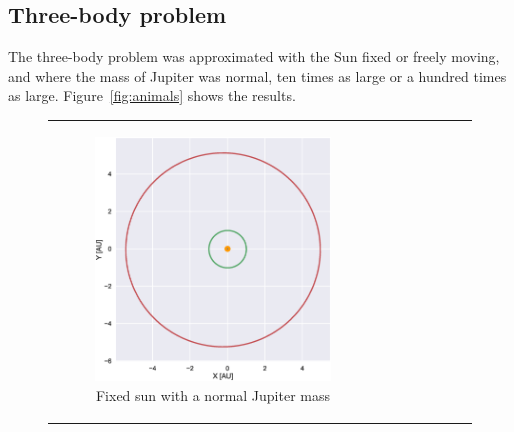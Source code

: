 \documentclass[aps,reprint]{revtex4-1}
\begin{document}
\subsection{Three-body problem}

The three-body problem was approximated with the Sun fixed or freely moving, and
where the mass of Jupiter was normal, ten times as large or a hundred times as
large. Figure~\ref{fig:animals} shows the results.
\begin{figure}
  \begin{tabular}{cc}
    \centering
    \begin{subfigure}[b]{0.5\columnwidth}
        \includegraphics[width=\columnwidth]{figures/jupiter_1.eps}
        \caption{Fixed sun with a normal Jupiter mass}
        \label{fix1}
    \end{subfigure}&
    \begin{subfigure}[b]{0.5\columnwidth}

\end{subfigure}
\end{tabular}
\end{figure}
\end{document}
